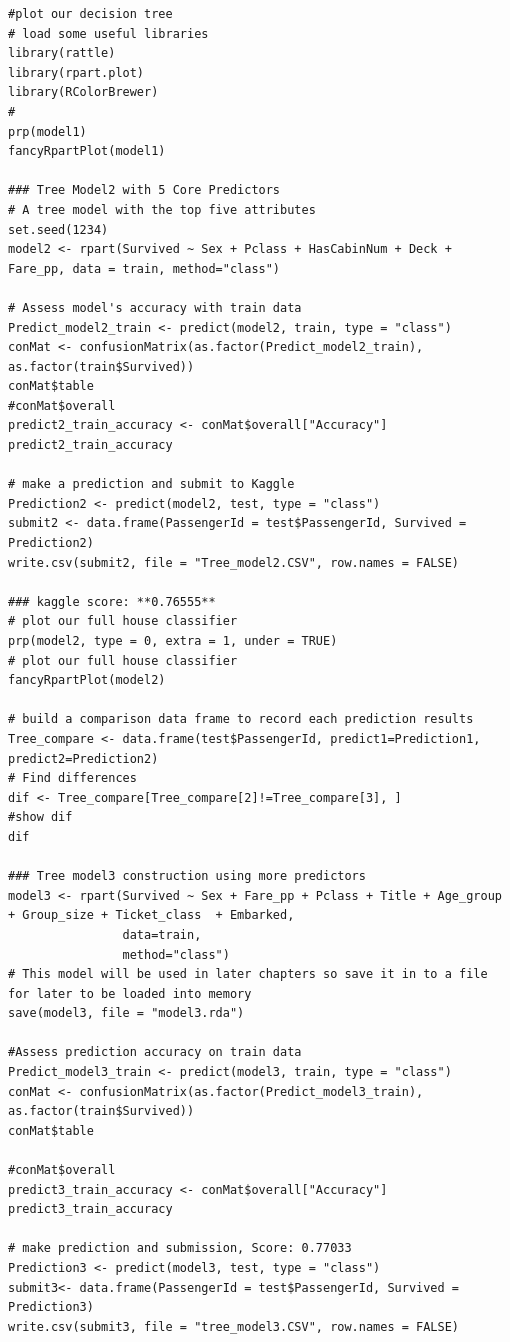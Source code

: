 \documentclass[
]{book}
\begin{document}
\begin{verbatim}
#plot our decision tree
# load some useful libraries
library(rattle)
library(rpart.plot)
library(RColorBrewer)
#
prp(model1)
fancyRpartPlot(model1)

### Tree Model2 with 5 Core Predictors
# A tree model with the top five attributes
set.seed(1234)
model2 <- rpart(Survived ~ Sex + Pclass + HasCabinNum + Deck + Fare_pp, data = train, method="class")

# Assess model's accuracy with train data
Predict_model2_train <- predict(model2, train, type = "class")
conMat <- confusionMatrix(as.factor(Predict_model2_train), as.factor(train$Survived))
conMat$table
#conMat$overall
predict2_train_accuracy <- conMat$overall["Accuracy"]
predict2_train_accuracy

# make a prediction and submit to Kaggle
Prediction2 <- predict(model2, test, type = "class")
submit2 <- data.frame(PassengerId = test$PassengerId, Survived = Prediction2)
write.csv(submit2, file = "Tree_model2.CSV", row.names = FALSE)

### kaggle score: **0.76555**
# plot our full house classifier
prp(model2, type = 0, extra = 1, under = TRUE)
# plot our full house classifier
fancyRpartPlot(model2)

# build a comparison data frame to record each prediction results
Tree_compare <- data.frame(test$PassengerId, predict1=Prediction1, predict2=Prediction2)
# Find differences
dif <- Tree_compare[Tree_compare[2]!=Tree_compare[3], ]
#show dif
dif

### Tree model3 construction using more predictors
model3 <- rpart(Survived ~ Sex + Fare_pp + Pclass + Title + Age_group + Group_size + Ticket_class  + Embarked,
                data=train,
                method="class")
# This model will be used in later chapters so save it in to a file for later to be loaded into memory
save(model3, file = "model3.rda")

#Assess prediction accuracy on train data
Predict_model3_train <- predict(model3, train, type = "class")
conMat <- confusionMatrix(as.factor(Predict_model3_train), as.factor(train$Survived))
conMat$table

#conMat$overall
predict3_train_accuracy <- conMat$overall["Accuracy"]
predict3_train_accuracy

# make prediction and submission, Score: 0.77033
Prediction3 <- predict(model3, test, type = "class")
submit3<- data.frame(PassengerId = test$PassengerId, Survived = Prediction3)
write.csv(submit3, file = "tree_model3.CSV", row.names = FALSE)


\end{verbatim}
\end{document}
